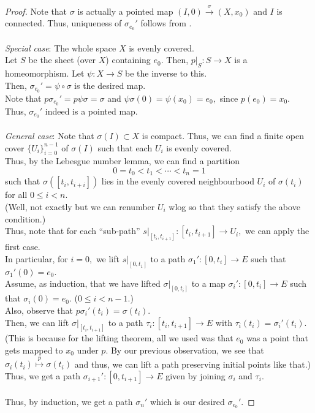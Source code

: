 \documentclass[12pt]{article}
\theoremstyle{definition}
\numberwithin{thm}{section}
\begin{document}
\begin{proof} 
	Note that $\sigma$ is actually a pointed map $(I, 0) \overset{\sigma}{\longrightarrow} (X, x_0)$ and $I$ is connected. Thus, uniqueness of $\sigma_{e_0}'$ follows from .\\~\\
	\emph{Special case}: The whole space $X$ is evenly covered. \\
	Let $S$ be the sheet (over $X$) containing $e_0.$ Then, $p|_S : S \to X$ is a homeomorphism. Let $\psi:X \to S$ be the inverse to this.\\
	Then, $\sigma_{e_0}' = \psi\circ\sigma$ is the desired map.\\
	Note that $p\sigma_{e_0}' = p\psi\sigma = \sigma$ and $\psi\sigma(0) = \psi(x_0) = e_0,$ since $p(e_0) = x_0.$ Thus, $\sigma_{e_0}'$ indeed is a pointed map.\\~\\
	\emph{General case}: Note that $\sigma(I) \subset X$ is compact. Thus, we can find a finite open cover $\{U_i\}_{i = 0}^{n-1}$ of $\sigma(I)$ such that each $U_i$ is evenly covered.\\
	Thus, by the Lebesgue number lemma, we can find a partition
	\begin{equation*} 
		0 = t_0 < t_1 < \cdots < t_n = 1
	\end{equation*}
	such that $\sigma([t_i, t_{i + i}])$ lies in the evenly covered neighbourhood $U_i$ of $\sigma(t_i)$ for all $0 \le i < n.$\\
	(Well, not exactly but we can renumber $U_i$ wlog so that they satisfy the above condition.)\\
	Thus, note that for each ``sub-path'' $s|_{[t_i, t_{i + 1}]} : [t_i, t_{i + 1}] \to U_i,$ we can apply the first case.\\
	In particular, for $i = 0,$ we lift $s|_{[0, t_1]}$ to a path $\sigma_1':[0, t_i] \to E$ such that $\sigma_1'(0) = e_0.$\\
	Assume, as induction, that we have lifted $\sigma|_{[0, t_i]}$ to a map $\sigma_i':[0, t_i] \to E$ such that $\sigma_i(0) = e_0.$ ($0 \le i < n - 1.$)\\
	Also, observe that $p\sigma_i'(t_i) = \sigma(t_i).$\\
	Then, we can lift $\sigma|_{[t_i, t_{i + 1}]}$ to a path $\tau_i:[t_i, t_{i + 1}] \to E$ with $\tau_i(t_i) = \sigma_i'(t_{i}).$ (This is because for the lifting theorem, all we used was that $e_0$ was a point that gets mapped to $x_0$ under $p$. By our previous observation, we see that $\sigma_i(t_i) \overset{p}{\mapsto}\sigma(t_i)$ and thus, we can lift a path preserving initial points like that.)\\
	Thus, we get a path $\sigma_{i+1}':[0, t_{i + 1}] \to E$ given by joining $\sigma_i$ and $\tau_i.$\\~\\
	Thus, by induction, we get a path $\sigma_n'$ which is our desired $\sigma_{e_0}'.$	
\end{proof}
\end{document}
